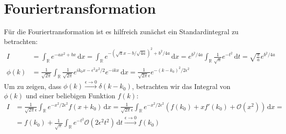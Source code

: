 \documentclass[a4paper,12pt]{article}
\begin{document}
\section{Fouriertransformation}
Für die Fouriertransformation ist es hilfreich zunächst ein Standardintegral zu betrachten:
\begin{align*}
I&=\int_\mathbb{R}e^{-ax^2+bx}\,\mathrm{d}x=\int_\mathbb{R}e^{-(\sqrt{a}x-b/\sqrt{4a})^2+b^2/4a}\,\mathrm{d}x=e^{b^2/4a}\int_\mathbb{R}\frac{1}{\sqrt{a}}e^{-t^2}\,\mathrm{d}t=\sqrt{\frac{\pi}{a}}e^{b^2/4a}\\
\phi (k)&=\frac{1}{\sqrt{2\pi}}\int_\mathbb{R}\frac{1}{\sqrt{2\pi}}e^{ik_0x-\epsilon^2x^2/2}e^{-ikx}\,\mathrm{d}x=\frac{1}{\sqrt{2\pi}\epsilon}e^{-(k-k_0)^2/2\epsilon^2}
\end{align*}
Um zu zeigen, dass $\phi (k)\overset{\epsilon\rightarrow 0}{\rightarrow}\delta (k-k_0)$, betrachten wir das Integral von $\phi (k)$ und einer beliebigen Funktion $f(k)$:
\begin{align*}
I&=\frac{1}{\sqrt{2\pi}\epsilon}\int_\mathbb{R}e^{-x^2/2\epsilon^2}f(x+k_0)\,\mathrm{d}x=\frac{1}{\sqrt{2\pi}\epsilon}\int_\mathbb{R}e^{-x^2/2\epsilon^2}(f(k_0)+xf'(k_0)+\mathcal{O}(x^2))\,\mathrm{d}x=\\ 
&=f(k_0) + \frac{1}{\sqrt{\pi}}\int_\mathbb{R}e^{-t^2}\mathcal{O}(2\epsilon^2t^2)\,\mathrm{d}t\overset{\epsilon\rightarrow 0}{\rightarrow}f(k_0)
\end{align*}
\end{document}
